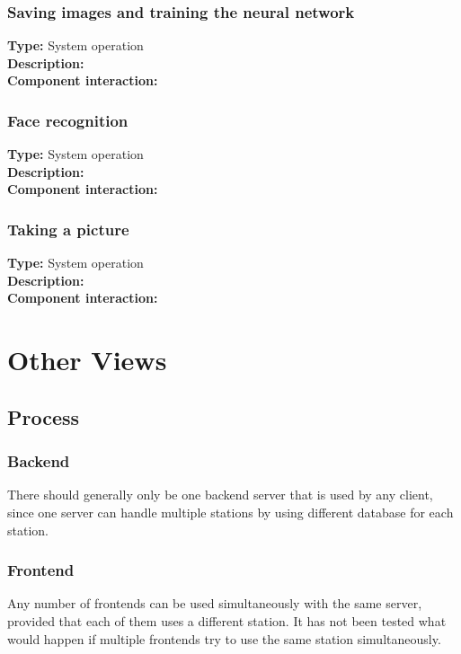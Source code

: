 \documentclass[11pt]{article}
\begin{document}
\subsubsection{Saving images and training the neural network}
\label{sec:add-train}
\textbf{Type:} System operation\\
\textbf{Description:}\\
\textbf{Component interaction:}\\

\subsubsection{Face recognition}
\label{sec:recognition}
\textbf{Type:} System operation\\
\textbf{Description:}\\
\textbf{Component interaction:}\\

\subsubsection{Taking a picture}
\label{sec:pic}
\textbf{Type:} System operation\\
\textbf{Description:} \\
\textbf{Component interaction:}\\


\section{Other Views}


\subsection{Process}
\subsubsection{Backend}
There should generally only be one backend server that is used by any
client, since one server can handle multiple stations by using
different database for each station.

\subsubsection{Frontend}
Any number of frontends can be used simultaneously with the same
server, provided that each of them uses a different station. It has
not been tested what would happen if multiple frontends try to use the
same station simultaneously.
\end{document}
